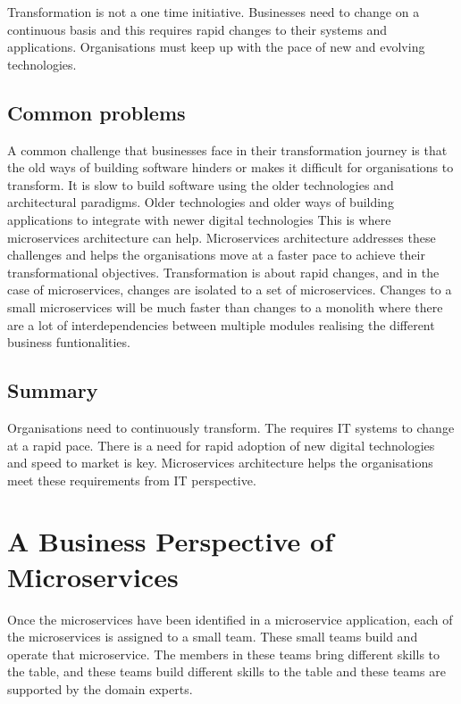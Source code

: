 \documentclass[a4paper, 11pt]{book}
\begin{document}
    Transformation is not a one time initiative.
    Businesses need to change on a continuous basis and this requires rapid changes to their systems and applications.
    Organisations must keep up with the pace of new and evolving technologies.

    \subsection{Common problems}
    A common challenge that businesses face in their transformation journey is that the old ways of building software hinders or makes it difficult for organisations to transform.
    It is slow to build software using the older technologies and architectural paradigms.
    Older technologies and older ways of building applications to integrate with newer digital technologies
    This is where microservices architecture can help.
    Microservices architecture addresses these challenges and helps the organisations move at a faster pace to achieve their transformational objectives.
    Transformation is about rapid changes, and in the case of microservices, changes are isolated to a set of microservices.
    Changes to a small microservices will be much faster than changes to a monolith where there are a lot of interdependencies between multiple modules realising the different business funtionalities.

    \subsection{Summary}
    Organisations need to continuously transform.
    The requires IT systems to change at a rapid pace.
    There is a need for rapid adoption of new digital technologies and speed to market is key.
    Microservices architecture helps the organisations meet these requirements from IT perspective.


    \section{A Business Perspective of Microservices}

    Once the microservices have been identified in a microservice application, each of the microservices is assigned to a small team.
    These small teams build and operate that microservice.
    The members in these teams bring different skills to the table, and these teams build different skills to the table and these teams are supported by the domain experts.
\end{document}

